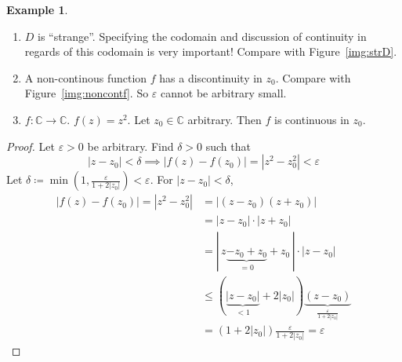 \documentclass[a4paper,landscape,twocolumn]{article}
\theoremstyle{definition}
\newtheorem{ex}{Example}
\newcommand\abs[1]{\left|#1\right|}
\begin{document}
\begin{ex}
  \begin{enumerate}
    \item $D$ is \enquote{strange}.
      Specifying the codomain and discussion of continuity in regards of this codomain is very important!
      Compare with Figure~\ref{img:strD}.
    \item A non-continous function $f$ has a discontinuity in $z_0$. Compare with Figure~\ref{img:noncontf}.
      So $\varepsilon$ cannot be arbitrary small.
    \item
      $f: \mathbb C \to \mathbb C$. $f(z) = z^2$.
      Let $z_0 \in \mathbb C$ arbitrary. Then $f$ is continuous in $z_0$.
  \end{enumerate}
\end{ex}
%
\begin{proof}
  Let $\varepsilon > 0$ be arbitrary. Find $\delta > 0$ such that
  \[ \abs{z - z_0} < \delta \implies \abs{f(z) - f(z_0)} = \abs{z^2 - z_0^2} < \varepsilon \]
  Let $\delta \coloneqq \min\left(1, \frac{\varepsilon}{1 + 2\abs{z_0}}\right) < \varepsilon$.
  For $\abs{z - z_0} < \delta$,
  \begin{align*}
    \abs{f(z) - f(z_0)} = \abs{z^2 - z_0^2}
    &= \abs{(z - z_0) (z + z_0)} \\
    &= \abs{z - z_0} \cdot \abs{z + z_0} \\
    &= |\, z \underbrace{- z_0 + z_0}_{=0} + z_0\,| \cdot \abs{z - z_0} \\
    &\leq (\underbrace{\abs{z - z_0}}_{<1} + 2 \abs{z_0}) \underbrace{(z - z_0)}_{\frac{\varepsilon}{1 + 2\abs{z_0}}} \\
    &= \left(1 + 2 \abs{z_0}\right) \frac{\varepsilon}{1 + 2\abs{z_0}} = \varepsilon
  \end{align*}
\end{proof}
%
\end{document}
